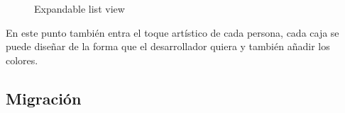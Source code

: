 \begin{figure}[H] 
  \begin{center} 
    \caption{Expandable list view} 
    \label{fig:ExpandableList} 
  \end{center} 
\end{figure}

En este punto también entra el toque artístico de cada persona, cada caja se puede diseñar de la forma que el desarrollador quiera y también añadir los colores.

\subsection{Migración}
\label{subsecc:Migración}

